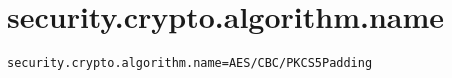 \section{security.crypto.algorithm.name}
\label{configuration:SecurityCryptoAlgorithmName}
\AvailableInJavaOnly{\TODO}
\begin{lstlisting}[style=Props,caption={Usage example for \textit{security.crypto.algorithm.name}}]
security.crypto.algorithm.name=AES/CBC/PKCS5Padding
\end{lstlisting}
